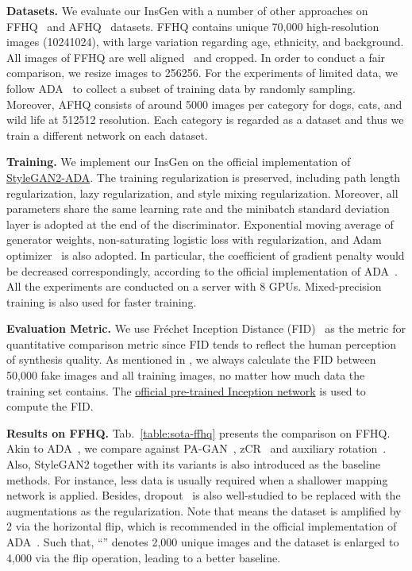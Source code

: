 \documentclass{article}
\begin{document}
\noindent\textbf{Datasets.}
We evaluate our InsGen with a number of other approaches on FFHQ~\cite{karras2019style} and AFHQ~\cite{choi2020starganv2} datasets. FFHQ contains unique 70,000 high-resolution images (10241024), with large variation regarding age, ethnicity, and background. All images of FFHQ are well aligned~\cite{kazemi2014one} and cropped. In order to conduct a fair comparison, we resize images to 256256. For the experiments of limited data, we follow ADA~\cite{karras2020training} to collect a subset of training data by randomly sampling. Moreover, AFHQ consists of around 5000 images per category for dogs, cats, and wild life at 512512 resolution. Each category is regarded as a dataset and thus we train a different network on each dataset.


\noindent\textbf{Training.}
We implement our InsGen on the official implementation of \href{https://github.com/NVlabs/stylegan2-ada-pytorch}{StyleGAN2-ADA}. The training regularization is preserved, including path length regularization, lazy regularization, and style mixing regularization. Moreover, all parameters share the same learning rate and the minibatch standard deviation layer is adopted at the end of the discriminator. Exponential moving average of generator weights, non-saturating logistic loss with  regularization, and Adam optimizer~\cite{kingma2014adam} is also adopted. In particular, the coefficient of gradient penalty would be decreased correspondingly, according to the official implementation of ADA~\cite{karras2020training}. All the experiments are conducted on a server with 8 GPUs. Mixed-precision training is also used for faster training.


\noindent\textbf{Evaluation Metric.}
We use Fréchet Inception Distance (FID)~\cite{heusel2017gans} as the metric for quantitative comparison metric since FID tends to reflect the human perception of synthesis quality. As mentioned in \cite{heusel2017gans}, we always calculate the FID between 50,000 fake images and all training images, no matter how much data the training set contains. The \href{http://download.tensorflow.org/models/image/imagenet/inception-2015-12-05.tgz}{official pre-trained Inception network} is used to compute the FID.


\noindent\textbf{Results on FFHQ.}
Tab.~\ref{table:sota-ffhq} presents the comparison on FFHQ. Akin to ADA~\cite{karras2020training}, we compare against PA-GAN~\cite{zhang2018pa}, zCR~\cite{zhao2020improved} and auxiliary rotation~\cite{chen2019self}. Also, StyleGAN2 together with its variants is also introduced as the baseline methods. For instance, less data is usually required when a shallower mapping network is applied. Besides, dropout~\cite{srivastava2014dropout} is also well-studied to be replaced with the augmentations as the regularization. Note that  means the dataset is amplified by 2 via the horizontal flip, which is recommended in the official implementation of ADA~\cite{karras2020training}. Such that, ``'' denotes 2,000 unique images and the dataset is enlarged to 4,000 via the flip operation, leading to a better baseline.
\end{document}
